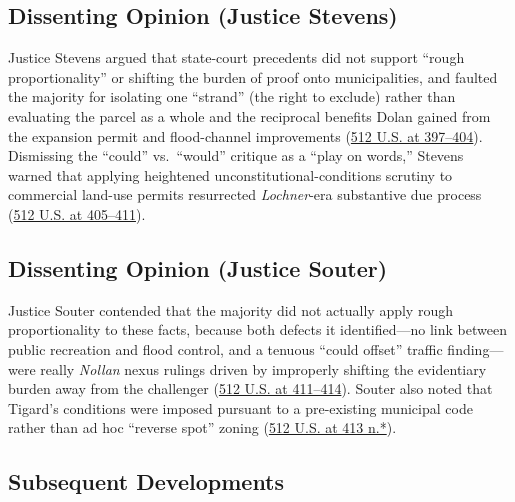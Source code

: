 \documentclass[12pt]{article}
\begin{document}
\subsection{Dissenting Opinion (Justice Stevens)}

Justice Stevens argued that state-court precedents did not support ``rough proportionality'' or shifting the burden of proof onto municipalities, and faulted the majority for isolating one ``strand'' (the right to exclude) rather than evaluating the parcel as a whole and the reciprocal benefits Dolan gained from the expansion permit and flood-channel improvements (\href{https://supreme.justia.com/cases/federal/us/512/374/}{512 U.S. at 397--404}). Dismissing the ``could'' vs.\ ``would'' critique as a ``play on words,'' Stevens warned that applying heightened unconstitutional-conditions scrutiny to commercial land-use permits resurrected \emph{Lochner}-era substantive due process (\href{https://supreme.justia.com/cases/federal/us/512/374/}{512 U.S. at 405--411}).

\subsection{Dissenting Opinion (Justice Souter)}

Justice Souter contended that the majority did not actually apply rough proportionality to these facts, because both defects it identified---no link between public recreation and flood control, and a tenuous ``could offset'' traffic finding---were really \emph{Nollan} nexus rulings driven by improperly shifting the evidentiary burden away from the challenger (\href{https://supreme.justia.com/cases/federal/us/512/374/}{512 U.S. at 411--414}). Souter also noted that Tigard's conditions were imposed pursuant to a pre-existing municipal code rather than ad hoc ``reverse spot'' zoning (\href{https://supreme.justia.com/cases/federal/us/512/374/}{512 U.S. at 413 n.*}).

\subsection{Subsequent Developments}
\end{document}
